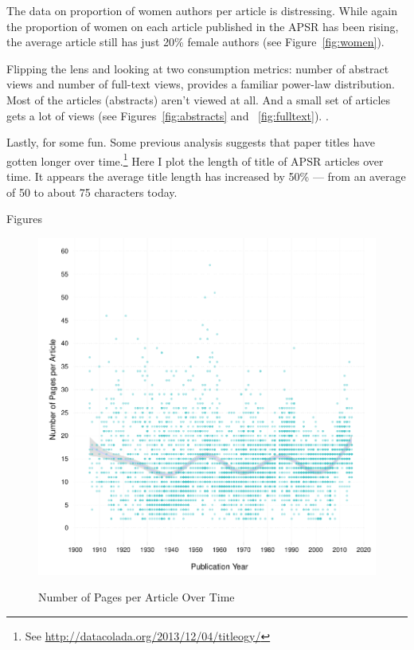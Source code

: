 \documentclass[12pt]{article}
\begin{document}
The data on proportion of women authors per article is distressing. While again the proportion of women on each article published in the APSR has been rising, the average article still has just 20\% female authors (see Figure~\ref{fig:women}).  

Flipping the lens and looking at two consumption metrics: number of abstract views and number of full-text views, provides a familiar power-law distribution. Most of the articles (abstracts) aren't viewed at all. And a small set of articles gets a lot of views (see Figures~\ref{fig:abstracts} and ~\ref{fig:fulltext}). .

Lastly, for some fun. Some previous analysis suggests that paper titles have gotten longer over time.\footnote{See \href{http://datacolada.org/2013/12/04/titleogy/}{http://datacolada.org/2013/12/04/titleogy/}} Here I plot the length of title of APSR articles over time. It appears the average title length has increased by 50\% --- from an average of 50 to about 75 characters today.

\clearpage
\begin{center}
\large{Figures}
\end{center}

\begin{figure}[htbp]
\centering
\caption{Number of Pages per Article Over Time}
\includegraphics[scale=.85]{../figs/n_pages_per_article_over_time.pdf}
\label{fig:pages}
\end{figure}
\end{document}

